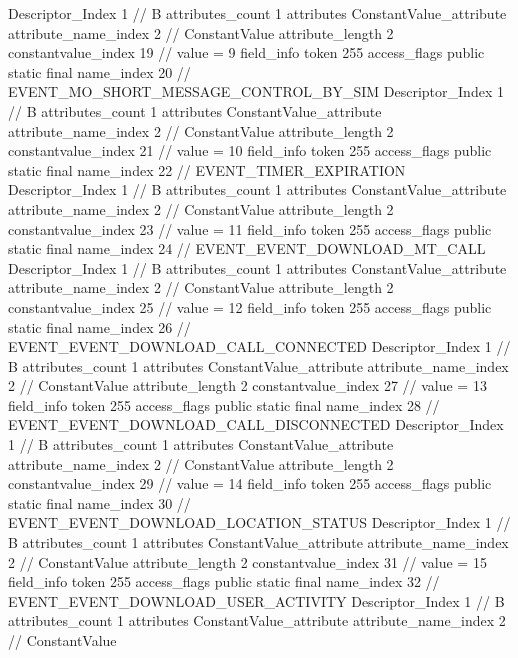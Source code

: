 {{{{{				Descriptor_Index	1		// B
				attributes_count	1
				attributes {
				ConstantValue_attribute {
					attribute_name_index	2		// ConstantValue
					attribute_length	2
					constantvalue_index	19		// value = 9
				}
				}
			}
			field_info {
				token	255
				access_flags	public static final
				name_index	20		// EVENT_MO_SHORT_MESSAGE_CONTROL_BY_SIM
				Descriptor_Index	1		// B
				attributes_count	1
				attributes {
				ConstantValue_attribute {
					attribute_name_index	2		// ConstantValue
					attribute_length	2
					constantvalue_index	21		// value = 10
				}
				}
			}
			field_info {
				token	255
				access_flags	public static final
				name_index	22		// EVENT_TIMER_EXPIRATION
				Descriptor_Index	1		// B
				attributes_count	1
				attributes {
				ConstantValue_attribute {
					attribute_name_index	2		// ConstantValue
					attribute_length	2
					constantvalue_index	23		// value = 11
				}
				}
			}
			field_info {
				token	255
				access_flags	public static final
				name_index	24		// EVENT_EVENT_DOWNLOAD_MT_CALL
				Descriptor_Index	1		// B
				attributes_count	1
				attributes {
				ConstantValue_attribute {
					attribute_name_index	2		// ConstantValue
					attribute_length	2
					constantvalue_index	25		// value = 12
				}
				}
			}
			field_info {
				token	255
				access_flags	public static final
				name_index	26		// EVENT_EVENT_DOWNLOAD_CALL_CONNECTED
				Descriptor_Index	1		// B
				attributes_count	1
				attributes {
				ConstantValue_attribute {
					attribute_name_index	2		// ConstantValue
					attribute_length	2
					constantvalue_index	27		// value = 13
				}
				}
			}
			field_info {
				token	255
				access_flags	public static final
				name_index	28		// EVENT_EVENT_DOWNLOAD_CALL_DISCONNECTED
				Descriptor_Index	1		// B
				attributes_count	1
				attributes {
				ConstantValue_attribute {
					attribute_name_index	2		// ConstantValue
					attribute_length	2
					constantvalue_index	29		// value = 14
				}
				}
			}
			field_info {
				token	255
				access_flags	public static final
				name_index	30		// EVENT_EVENT_DOWNLOAD_LOCATION_STATUS
				Descriptor_Index	1		// B
				attributes_count	1
				attributes {
				ConstantValue_attribute {
					attribute_name_index	2		// ConstantValue
					attribute_length	2
					constantvalue_index	31		// value = 15
				}
				}
			}
			field_info {
				token	255
				access_flags	public static final
				name_index	32		// EVENT_EVENT_DOWNLOAD_USER_ACTIVITY
				Descriptor_Index	1		// B
				attributes_count	1
				attributes {
				ConstantValue_attribute {
					attribute_name_index	2		// ConstantValue
}}}}}}}
